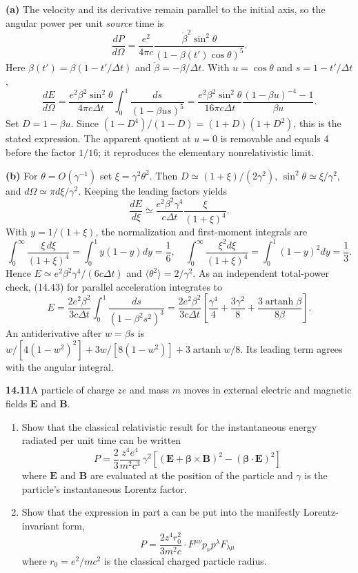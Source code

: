 \textbf{(a)} The velocity and its derivative remain parallel to the initial
axis, so the angular power per unit \emph{source} time is
\[
\frac{dP}{d\Omega}=\frac{e^2}{4\pi c}
\frac{\dot\beta^2\sin^2\theta}{(1-\beta(t')\cos\theta)^5}.
\]
Here $\beta(t')=\beta(1-t'/\Delta t)$ and
$\dot\beta=-\beta/\Delta t$. With $u=\cos\theta$ and
$s=1-t'/\Delta t$,
\[
\frac{dE}{d\Omega}=
\frac{e^2\beta^2\sin^2\theta}{4\pi c\Delta t}
\int_0^1\frac{ds}{(1-\beta us)^5}
=\frac{e^2\beta^2\sin^2\theta}{16\pi c\Delta t}
\frac{(1-\beta u)^{-4}-1}{\beta u}.
\]
Set $D=1-\beta u$. Since
$(1-D^4)/(1-D)=(1+D)(1+D^2)$, this is the stated expression.
The apparent quotient at $u=0$ is removable and equals 4 before the
factor $1/16$; it reproduces the elementary nonrelativistic limit.

\textbf{(b)} For $\theta=O(\gamma^{-1})$ set
$\xi=\gamma^2\theta^2$. Then
$D\simeq(1+\xi)/(2\gamma^2)$,
$\sin^2\theta\simeq\xi/\gamma^2$, and
$d\Omega\simeq\pi d\xi/\gamma^2$. Keeping the leading factors yields
\[
\boxed{\frac{dE}{d\xi}\simeq
\frac{e^2\beta^2\gamma^4}{c\Delta t}
\frac{\xi}{(1+\xi)^4}.}
\]
With $y=1/(1+\xi)$, the normalization and first-moment integrals are
\[
\int_0^\infty\frac{\xi\,d\xi}{(1+\xi)^4}
=\int_0^1y(1-y)dy=\frac16,
\quad
\int_0^\infty\frac{\xi^2d\xi}{(1+\xi)^4}
=\int_0^1(1-y)^2dy=\frac13.
\]
Hence $E\simeq e^2\beta^2\gamma^4/(6c\Delta t)$ and
$\langle\theta^2\rangle=2/\gamma^2$.
As an independent total-power check, (14.43) for parallel acceleration
integrates to
\[
E=\frac{2e^2\beta^2}{3c\Delta t}
\int_0^1\frac{ds}{(1-\beta^2s^2)^3}
=\frac{2e^2\beta^2}{3c\Delta t}
\left[\frac{\gamma^4}{4}+\frac{3\gamma^2}{8}
+\frac{3\operatorname{artanh}\beta}{8\beta}\right].
\]
An antiderivative after $w=\beta s$ is
$w/[4(1-w^2)^2]+3w/[8(1-w^2)]+3\operatorname{artanh}w/8$.
Its leading term agrees with the angular integral.

\par\bigskip
\noindent\textbf{14.11}\quad A particle of charge $ze$ and mass $m$ moves in external electric and magnetic fields $\mathbf{E}$ and $\mathbf{B}$.
\begin{enumerate}
\item[(a)] Show that the classical relativistic result for the instantaneous energy radiated per unit time can be written
\[
P=\frac{2}{3}\frac{z^{4}e^{4}}{m^{2}c^{3}}\,\gamma^{2}[(\mathbf{E}+\boldsymbol{\beta}\times\mathbf{B})^{2}-(\boldsymbol{\beta}\cdot\mathbf{E})^{2}]
\]
where $\mathbf{E}$ and $\mathbf{B}$ are evaluated at the position of the particle and $\gamma$ is the particle's instantaneous Lorentz factor.
\item[(b)] Show that the expression in part a can be put into the manifestly Lorentz-invariant form,
\[
P=\frac{2z^{4}r_{0}^{2}}{3m^{2}c}\cdot F^{\mu\nu}p_{\nu}p^{\lambda}F_{\lambda\mu}
\]
where $r_{0}=e^{2}/mc^{2}$ is the classical charged particle radius.
\end{enumerate}
\solution

